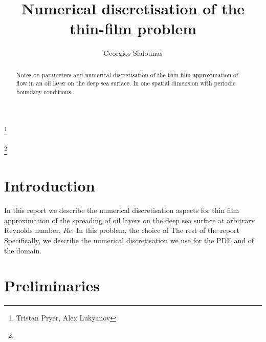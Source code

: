 \documentclass{amsart}
\theoremstyle{definition}
\theoremstyle{remark}
\numberwithin{equation}{section}
\begin{document}
\title{Numerical discretisation of the thin-film problem}


\author{Georgios Sialounas}
\address{}
\curraddr{}
\thanks{Tristan Pryer, Alex Lukyanov}

\author{}
\address{}
\curraddr{}
\email{}
\thanks{}


\keywords{}

\date{}

\dedicatory{}

\begin{abstract}
	Notes on parameters and numerical discretisation of the thin-film approximation of flow in an oil layer on the deep sea surface. In one spatial dimension with periodic boundary conditions.
\end{abstract}

\maketitle

\section{Introduction}
In this report we describe the numerical discretisation aspects for thin film approximation of the spreading of oil layers on the deep sea surface at arbitrary Reynolds number, $Re$.  In this problem, the choice of  The rest of the report  Specifically, we describe the numerical discretisation we use for the PDE and of the domain.  


\section{Preliminaries}
\end{document}
